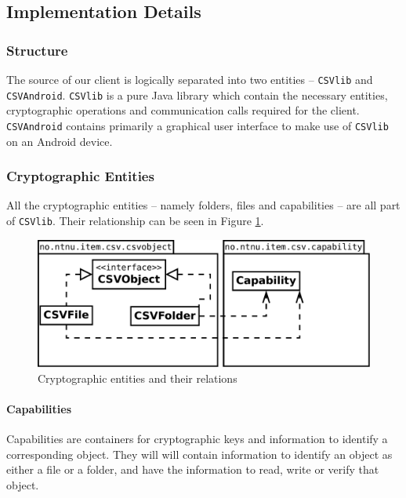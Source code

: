 \documentclass[pdftex,english,10pt,b5paper,twoside]{book}
\begin{document}
\subsection{Implementation Details}
\label{sec:cli:impl:det}

\subsubsection{Structure}
The source of our client is logically separated into two entities --
\texttt{CSVlib} and \texttt{CSVAndroid}. \texttt{CSVlib} is a pure Java library which
contain the necessary entities, cryptographic operations and communication
calls required for the client. \texttt{CSVAndroid} contains primarily a graphical user
interface to make use of \texttt{CSVlib} on an Android device.

\subsubsection{Cryptographic Entities} 
\label{sec:cryptoentities} 

All the cryptographic entities -- namely folders, files and capabilities -- are
all part of \texttt{CSVlib}. Their relationship can be seen in Figure
\ref{fig:CSVlib:overview}.

\begin{figure}[h!]
    \centering
    \includegraphics[scale=0.4]{csvobjects.pdf}
    \caption{Cryptographic entities and their relations}
    \label{fig:CSVlib:overview}
\end{figure}

\paragraph{Capabilities} Capabilities are containers for
cryptographic keys and information to identify a corresponding object. They
will will contain information to identify an object as either a file or a
folder, and have the information to read, write or verify that object.
\end{document}
